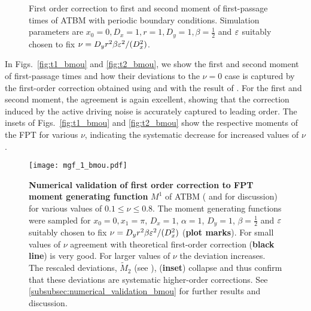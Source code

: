 \documentclass[%
 reprint,
superscriptaddress,
nofootinbib,
 amsmath,amssymb,
 aps,
prx,
]{revtex4-2}
\begin{document}
\label{subsec:atbmnumerics}
\begin{figure*}
    \quad
    \label{}
    \caption{First order correction to first and second moment of first-passage times of ATBM with periodic boundary conditions. Simulation parameters are $x_0 = 0, D_x = 1, r=1, D_y = 1, \beta = \frac{1}{2}$ and $\varepsilon$ suitably chosen to fix $\nu = D_y r^2 \beta \varepsilon^2/(D_x^2)$.}
\end{figure*}

In Figs.~\ref{fig:t1_bmou} and \ref{fig:t2_bmou}, we show the first and second moment of first-passage times and how their deviations to the $\nu=0$ case is captured by the first-order correction obtained using  and  with the result of . For the first and second moment, the agreement is again excellent, showing that the correction induced by the active driving noise is accurately captured to leading order. The insets of Figs.~\ref{fig:t1_bmou} and \ref{fig:t2_bmou} show the respective moments of the FPT for various $\nu$, indicating the systematic decrease for increased values of $\nu$.


\begin{figure}
\texttt{[image: mgf\_1\_bmou.pdf]}
\caption{\textbf{Numerical validation of first order correction to FPT moment generating function} $M^1$ of ATBM (\cf {} and  for discussion) for various values of $0.1 \leq \nu \leq 0.8$. The moment generating functions were sampled for $x_0=0, x_1 = \pi$, $D_x = 1$, $\alpha = 1$, $D_y = 1$, $\beta = \frac{1}{2}$ and $\varepsilon$ suitably chosen to fix $\nu = D_yr^2  \beta  \varepsilon^2/(D_x^2)$ (\textbf{plot marks}). For small values of $\nu$ agreement with theoretical first-order correction (\textbf{black line}) is very good. For larger values of $\nu$ the deviation  increases. The rescaled deviations, $\tilde{M}_2$ (see ), (\textbf{inset}) collapse and thus confirm that these deviations are systematic higher-order corrections. See \eqref{subsubsec:numerical_validation_bmou} for further results and discussion.}
\label{fig:mgf_bmou}
\end{figure}
\end{document}
